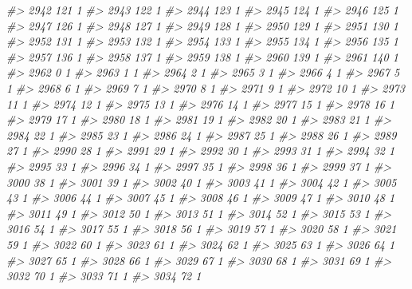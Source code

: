 \documentclass[]{article}
\newenvironment{Shaded}{\begin{snugshade}}{\end{snugshade}}
\newcommand{\CommentTok}[1]{\textcolor[rgb]{0.56,0.35,0.01}{\textit{#1}}}
\begin{document}
\begin{Shaded}
\begin{Highlighting}[]
\CommentTok{#> 2942 121  1}
\CommentTok{#> 2943 122  1}
\CommentTok{#> 2944 123  1}
\CommentTok{#> 2945 124  1}
\CommentTok{#> 2946 125  1}
\CommentTok{#> 2947 126  1}
\CommentTok{#> 2948 127  1}
\CommentTok{#> 2949 128  1}
\CommentTok{#> 2950 129  1}
\CommentTok{#> 2951 130  1}
\CommentTok{#> 2952 131  1}
\CommentTok{#> 2953 132  1}
\CommentTok{#> 2954 133  1}
\CommentTok{#> 2955 134  1}
\CommentTok{#> 2956 135  1}
\CommentTok{#> 2957 136  1}
\CommentTok{#> 2958 137  1}
\CommentTok{#> 2959 138  1}
\CommentTok{#> 2960 139  1}
\CommentTok{#> 2961 140  1}
\CommentTok{#> 2962   0  1}
\CommentTok{#> 2963   1  1}
\CommentTok{#> 2964   2  1}
\CommentTok{#> 2965   3  1}
\CommentTok{#> 2966   4  1}
\CommentTok{#> 2967   5  1}
\CommentTok{#> 2968   6  1}
\CommentTok{#> 2969   7  1}
\CommentTok{#> 2970   8  1}
\CommentTok{#> 2971   9  1}
\CommentTok{#> 2972  10  1}
\CommentTok{#> 2973  11  1}
\CommentTok{#> 2974  12  1}
\CommentTok{#> 2975  13  1}
\CommentTok{#> 2976  14  1}
\CommentTok{#> 2977  15  1}
\CommentTok{#> 2978  16  1}
\CommentTok{#> 2979  17  1}
\CommentTok{#> 2980  18  1}
\CommentTok{#> 2981  19  1}
\CommentTok{#> 2982  20  1}
\CommentTok{#> 2983  21  1}
\CommentTok{#> 2984  22  1}
\CommentTok{#> 2985  23  1}
\CommentTok{#> 2986  24  1}
\CommentTok{#> 2987  25  1}
\CommentTok{#> 2988  26  1}
\CommentTok{#> 2989  27  1}
\CommentTok{#> 2990  28  1}
\CommentTok{#> 2991  29  1}
\CommentTok{#> 2992  30  1}
\CommentTok{#> 2993  31  1}
\CommentTok{#> 2994  32  1}
\CommentTok{#> 2995  33  1}
\CommentTok{#> 2996  34  1}
\CommentTok{#> 2997  35  1}
\CommentTok{#> 2998  36  1}
\CommentTok{#> 2999  37  1}
\CommentTok{#> 3000  38  1}
\CommentTok{#> 3001  39  1}
\CommentTok{#> 3002  40  1}
\CommentTok{#> 3003  41  1}
\CommentTok{#> 3004  42  1}
\CommentTok{#> 3005  43  1}
\CommentTok{#> 3006  44  1}
\CommentTok{#> 3007  45  1}
\CommentTok{#> 3008  46  1}
\CommentTok{#> 3009  47  1}
\CommentTok{#> 3010  48  1}
\CommentTok{#> 3011  49  1}
\CommentTok{#> 3012  50  1}
\CommentTok{#> 3013  51  1}
\CommentTok{#> 3014  52  1}
\CommentTok{#> 3015  53  1}
\CommentTok{#> 3016  54  1}
\CommentTok{#> 3017  55  1}
\CommentTok{#> 3018  56  1}
\CommentTok{#> 3019  57  1}
\CommentTok{#> 3020  58  1}
\CommentTok{#> 3021  59  1}
\CommentTok{#> 3022  60  1}
\CommentTok{#> 3023  61  1}
\CommentTok{#> 3024  62  1}
\CommentTok{#> 3025  63  1}
\CommentTok{#> 3026  64  1}
\CommentTok{#> 3027  65  1}
\CommentTok{#> 3028  66  1}
\CommentTok{#> 3029  67  1}
\CommentTok{#> 3030  68  1}
\CommentTok{#> 3031  69  1}
\CommentTok{#> 3032  70  1}
\CommentTok{#> 3033  71  1}
\CommentTok{#> 3034  72  1}

\end{Highlighting}
\end{Shaded}
\end{document}
